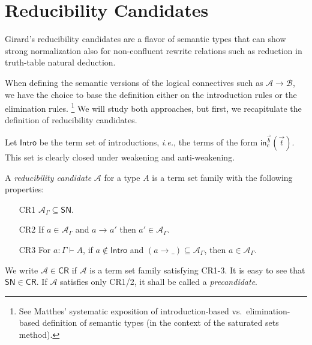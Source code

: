 \documentclass[a4paper,USenglish,cleveref, autoref, thm-restate]{lipics-v2019}
\makeatletter
\def\namedlabel#1#2{\begingroup
    #2%
    \def\@currentlabel{#2}%
    \phantomsection\label{#1}\endgroup
}
\newcommand{\ie}{\emph{i.e.}\xspace}
\newcommand{\tin}{\ensuremath{\mathsf{in}}}
\newcommand{\red}[1][]{\longrightarrow_{#1}}
\newcommand{\CR}{\mathsf{CR}}
\newcommand{\A}{\mathcal{A}}
\newcommand{\B}{\mathcal{B}}
\newcommand{\SN}{\mathsf{SN}}
\newcommand{\Intro}{\mathsf{Intro}}
\newcommand{\indy}[1]{_{#1}}
\makeatother
\begin{document}
\section{Reducibility Candidates}
\label{sec:cr}

Girard's reducibility candidates are a flavor of semantic types that
can show strong normalization also for non-confluent rewrite relations
such as reduction in truth-table natural deduction.

When defining the semantic versions of the logical connectives such as
$\A \to \B$, we have the choice to base the definition either on the
introduction rules or the elimination rules.%
\footnote{See Matthes' \cite[Section 6.2]{matthes:intersection}
  systematic exposition of introduction-based vs.\ elimination-based
  definition of semantic types (in the context of the saturated sets method).}
We will study both
approaches, but first, we recapitulate the definition of reducibility
candidates.

Let $\Intro$ be the term set of introductions, \ie, the terms of
the form $\tin^{\vec b}_c(\vec t)$.  This set is clearly closed under
weakening and anti-weakening.

A \emph{reducibility candidate} $\A$ for a type $A$
is a term set family
with the following properties:
\begin{itemize}%
\setlength{\itemindent}{2.7em}


\item[\namedlabel{it:cr1}{CR1}]
  $\A\indy\Gamma \subseteq \SN$.

\item[\namedlabel{it:cr2}{CR2}]
  If $a \in \A\indy\Gamma$ and $a \red a'$ then $a' \in \A\indy\Gamma$.

\item[\namedlabel{it:cr3}{CR3}]
  For $a : \Gamma \vdash A$,
  if $a \not\in \Intro$
  and $(a \red \_) \subseteq \A\indy\Gamma$, then $a \in \A\indy\Gamma$.

\end{itemize}
We write $\A \in \CR$ if $\A$ is a term set family satisfying CR1-3.
It is easy to see that $\SN \in \CR$.
If $\A$ satisfies only CR1/2, it shall be called a \emph{precandidate}.
\end{document}
